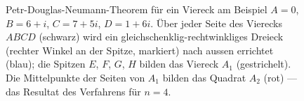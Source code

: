 \begin{figure}
\caption{Petr-Douglas-Neumann-Theorem für ein Viereck am Beispiel
$A = 0$, $B = 6 + i$, $C = 7 + 5i$, $D = 1 + 6i$.
Über jeder Seite des Vierecks $ABCD$ (schwarz) wird ein
gleichschenklig-rechtwinkliges Dreieck (rechter Winkel an der Spitze,
markiert) nach aussen errichtet (blau);
die Spitzen $E$, $F$, $G$, $H$ bilden das Viereck $A_1$ (gestrichelt).
Die Mittelpunkte der Seiten von $A_1$ bilden das Quadrat $A_2$ (rot) ---
das Resultat des Verfahrens für $n = 4$.
\label{komplex:figure:pdn-quadrat}}
\end{figure}
